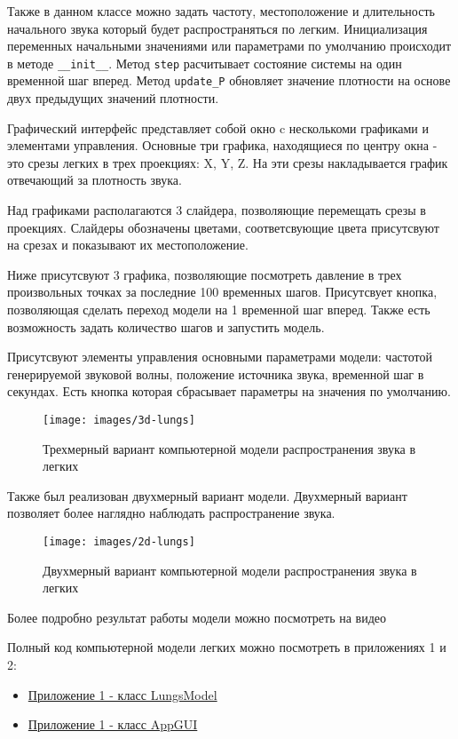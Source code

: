 \documentclass[../main.tex]{subfiles}
\begin{document}
Также в данном классе можно задать частоту, местоположение и длительность начального звука который будет распространяться по легким. Инициализация переменных начальными значениями или параметрами по умолчанию происходит в методе \texttt{\_\_init\_\_}. Метод \texttt{step} расчитывает состояние системы на один временной шаг вперед. Метод \texttt{update\_P} обновляет значение плотности на основе двух предыдущих значений плотности.

Графический интерфейс представляет собой окно c несколькоми графиками и элементами управления. Основные три графика, находящиеся по центру окна - это срезы легких в трех проекциях: X, Y, Z. На эти срезы накладывается график отвечающий за плотность звука. 

Над графиками располагаются 3 слайдера, позволяющие перемещать срезы в проекциях. Слайдеры обозначены цветами, соответсвующие цвета присутсвуют на срезах и показывают их местоположение.

Ниже присутсвуют 3 графика, позволяющие посмотреть давление в трех произвольных точках за последние 100 временных шагов. Присутсвует кнопка, позволяющая сделать переход модели на 1 временной шаг вперед. Также есть возможность задать количество шагов и запустить модель.

Присутсвуют элементы управления основными параметрами модели: частотой генерируемой звуковой волны, положение источника звука, временной шаг в секундах. Есть кнопка которая сбрасывает параметры на значения по умолчанию.

\begin{figure}[H]
\centering
\texttt{[image: images/3d-lungs]}
\caption{Трехмерный вариант компьютерной модели распространения звука в легких}
\end{figure}


Также был реализован двухмерный вариант модели. Двухмерный вариант позволяет более наглядно наблюдать распространение звука.


\begin{figure}[H]
\centering
\texttt{[image: images/2d-lungs]}
\caption{Двухмерный вариант компьютерной модели распространения звука в легких}
\end{figure}

Более подробно результат работы модели можно посмотреть на видео \cite{lungs-2d-youtube}

Полный код компьютерной модели легких можно посмотреть в приложениях 1 и 2:
\begin{itemize}
    \item \hyperref[appendix1]{Приложение 1 -  класс LungsModel}
    \item \hyperref[appendix2]{Приложение 1 -  класс AppGUI}
\end{itemize}
 

\newpage
\end{document}
